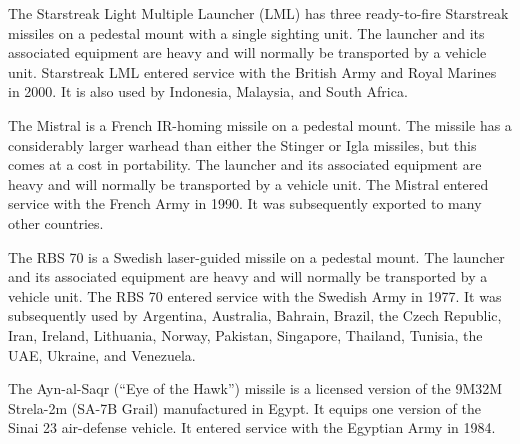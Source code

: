 \begin{withcounters}
    The Starstreak Light Multiple Launcher (LML) has three ready-to-fire Starstreak missiles on a pedestal mount with a single sighting unit. The launcher and its associated equipment are heavy and will normally be transported by a vehicle unit.
    Starstreak LML entered service with the British Army and Royal Marines in 2000.
    It is also used by Indonesia, Malaysia, and South Africa.%


    The Mistral is a French IR-homing missile on a pedestal mount. The missile has a considerably larger warhead than either the Stinger or Igla missiles, but this comes at a cost in portability. The launcher and its associated equipment are heavy and will normally be transported by a vehicle unit.
    The Mistral entered service with the French Army in 1990. It was subsequently exported to many other countries.%

    The RBS 70 is a Swedish laser-guided missile on a pedestal mount. The launcher and its associated equipment are heavy and will normally be transported by a vehicle unit.
    The RBS 70 entered service with the Swedish Army in 1977. It was subsequently used by Argentina, Australia, Bahrain, Brazil, the Czech Republic, Iran, Ireland, Lithuania, Norway, Pakistan, Singapore, Thailand, Tunisia, the UAE, Ukraine, and Venezuela.%


    The Ayn-al-Saqr (“Eye of the Hawk”) missile is a  licensed version of the 9M32M Strela-2m (SA-7B Grail) manufactured in Egypt. It equips one version of the Sinai 23 air-defense vehicle.
    It entered service with the Egyptian Army in 1984.%

\end{withcounters}

\begin{table}[p]
    \centering
    \footnotesize
    
\end{table}

\begin{table}[p]
    \centering
    \footnotesize
    
\end{table}

